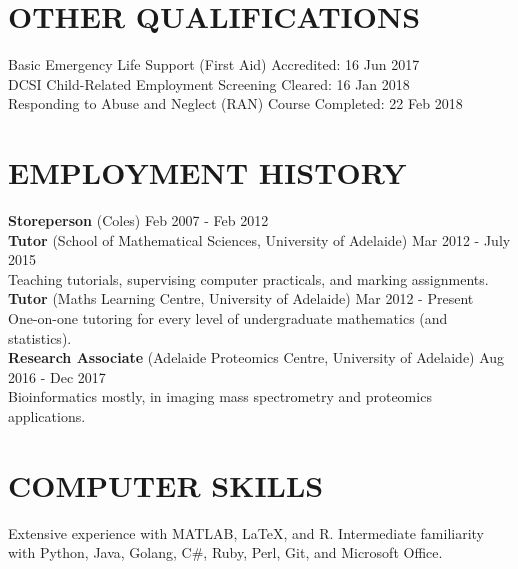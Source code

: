 \documentclass{res}
\begin{document}
\begin{resume}
\section{OTHER QUALIFICATIONS}
Basic Emergency Life Support (First Aid) \hfill Accredited: 16 Jun 2017 \\
DCSI Child-Related Employment Screening \hfill Cleared: 16 Jan 2018 \\ \vspace{-0.5cm}
Responding to Abuse and Neglect (RAN) Course \hfill Completed: 22 Feb 2018 \\


\section{EMPLOYMENT HISTORY}
{\bf Storeperson} (Coles) \hfill Feb 2007 - Feb 2012 \\
{\bf Tutor} (School of Mathematical Sciences, University of Adelaide) \hfill Mar 2012 - July 2015 \\
Teaching tutorials, supervising computer practicals, and marking assignments. \\
{\bf Tutor} (Maths Learning Centre, University of Adelaide) \hfill Mar 2012 - Present \\
One-on-one tutoring for every level of undergraduate mathematics (and statistics). \\
{\bf Research Associate } (Adelaide Proteomics Centre, University of Adelaide) \hfill Aug 2016 - Dec 2017 \\
Bioinformatics mostly, in imaging mass spectrometry and proteomics applications. \\ \vspace{-0.5cm}



\section{COMPUTER SKILLS}          
Extensive experience with MATLAB, \LaTeX, and R.
Intermediate familiarity with Python, Java, Golang, C\#, Ruby, Perl, Git, 
and Microsoft Office. \\ \vspace{-0.5cm}
 

\end{resume}
\end{document}
